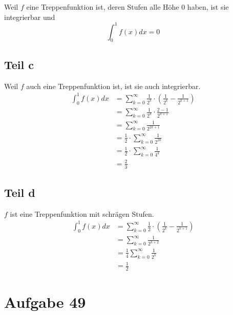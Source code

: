 \documentclass[a4paper,10pt]{article}
\begin{document}
Weil $f$ eine Treppenfunktion ist, deren Stufen alle Höhe $0$ haben, ist sie integrierbar und
\begin{equation}
 \int_0^1 f(x) dx = 0
\end{equation}

\subsection*{Teil c}

Weil $f$ auch eine Treppenfunktion ist, ist sie auch integrierbar.
\begin{align*}
 \int_0^1 f(x) dx & = \sum_{k = 0}^\infty \frac{1}{2^k} \cdot \left( \frac{1}{2^k} - \frac{1}{2^{k + 1}} \right)\\
 & = \sum_{k = 0}^\infty \frac{1}{2^k} \cdot \frac{2 - 1}{2^{k + 1}}\\
 & = \sum_{k = 0}^\infty \frac{1}{2^{2k + 1}}\\
 & = \frac{1}{2} \cdot \sum_{k = 0}^\infty \frac{1}{2^{2k}}\\
 & = \frac{1}{2} \cdot \sum_{k = 0}^\infty \frac{1}{4^k}\\
 & = \frac{2}{3}
\end{align*}

\subsection*{Teil d}

$f$ ist eine Treppenfunktion mit schrägen Stufen.
\begin{align*}
 \int_0^1 f(x) dx & = \sum_{k = 0}^\infty \frac{1}{2} \cdot \left( \frac{1}{2^k} - \frac{1}{2^{k + 1}} \right)\\
 & = \sum_{k = 0}^\infty \frac{1}{2^{k + 2}}\\
 & = \frac{1}{4} \sum_{k = 0}^\infty \frac{1}{2^k}\\
 & = \frac{1}{2}
\end{align*}

\section*{Aufgabe 49}
\end{document}
